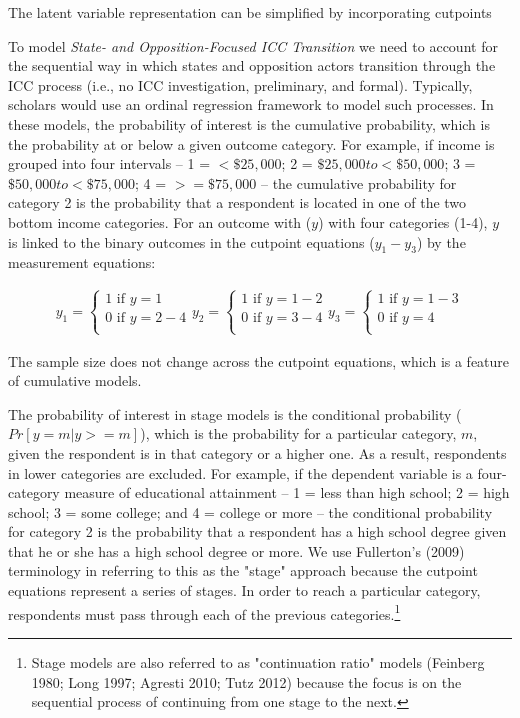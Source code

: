 The latent variable representation can be simplified by incorporating cutpoints 

To model \emph{State- and Opposition-Focused ICC Transition} we need to account for the sequential way in which states and opposition actors transition through the ICC process (i.e., no ICC investigation, preliminary, and formal). Typically, scholars would use an ordinal regression framework to model such processes. In these models, the probability of interest is the cumulative probability, which is the probability at or below a given outcome category. For example, if income is grouped into four intervals -- 1 = $< \$25,000$; 2 = $\$25,000 to <\$50,000$; 3 = $\$50,000 to <\$75,000$; 4 = $>=\$75,000$ -- the cumulative probability for category 2 is the probability that a respondent is located in one of the two bottom income categories. For an outcome with ($y$) with four categories (1-4), $y$ is linked to the binary outcomes in the cutpoint equations ($y_{1} - y_{3}$) by the measurement equations:

\begin{eqnarray}
	y_{1} =
	\begin{cases}
	1 \text{ if } y = 1 \nonumber \\
	0 \text{ if } y = 2-4 \nonumber \\
\end{cases}
	y_{2} =
	\begin{cases}
	1 \text{ if } y = 1-2 \nonumber \\
	0 \text{ if } y = 3-4 \nonumber \\
\end{cases}
	y_{3} =
	\begin{cases}
	1 \text{ if } y = 1-3 \nonumber \\
	0 \text{ if } y = 4 \nonumber \\
\end{cases}
\end{eqnarray}

The sample size does not change across the cutpoint equations, which is a feature of cumulative models.

The probability of interest in stage models is the conditional probability ($Pr[ y = m | y >= m]$), which is the probability for a particular category, $m$, given the respondent is in that category or a higher one. As a result, respondents in lower categories are excluded. For example, if the dependent variable is a four-category measure of educational attainment -- 1 = less than high school; 2 = high school; 3 = some college; and 4 = college or more -- the conditional probability for category 2 is the probability that a respondent has a high school degree given that he or she has a high school degree or more. We use Fullerton's (2009) terminology in referring to this as the "stage" approach because the cutpoint equations represent a series of stages. In order to reach a particular category, respondents must pass through each of the previous categories.\footnote{Stage models are also referred to as "continuation ratio" models (Feinberg 1980; Long 1997; Agresti 2010; Tutz 2012) because the focus is on the sequential process of continuing from one stage to the next. }

